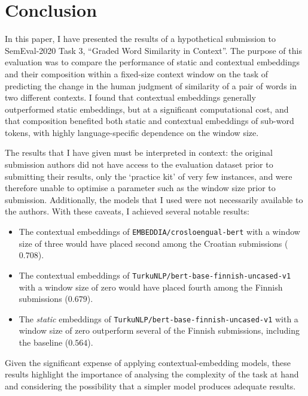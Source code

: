 \section{Conclusion}
\label{sec:conclusion}

In this paper, I have presented the results of a hypothetical submission to SemEval-2020
Task 3, ``Graded Word Similarity in Context''.
The purpose of this evaluation was to compare the performance of static and contextual
embeddings and their composition within a fixed-size context window on the task of
predicting the change in the human judgment of similarity of a pair of words in two
different contexts.
I found that contextual embeddings generally outperformed static embeddings, but at a
significant computational cost, and that composition benefited both static and
contextual embeddings of sub-word tokens, with highly language-specific dependence
on the window size.

The results that I have given must be interpreted in context: the original submission
authors did not have access to the evaluation dataset prior to submitting their results,
only the `practice kit' of very few instances, and were therefore unable to optimise a
parameter such as the window size prior to submission.
Additionally, the models that I used were not necessarily available to the authors.
With these caveats, I achieved several notable results:
\begin{itemize}
  \item The contextual embeddings of \texttt{EMBEDDIA/crosloengual-bert} with a window
        size of three would have placed second among the Croatian submissions
        ($0.708$).
  \item The contextual embeddings of \texttt{TurkuNLP/bert-base-finnish-uncased-v1} with
        a window size of zero would have placed fourth among the Finnish submissions
        ($0.679$).
  \item The \emph{static} embeddings of \texttt{TurkuNLP/bert-base-finnish-uncased-v1}
        with a window size of zero outperform several of the Finnish submissions,
        including the baseline ($0.564$).
\end{itemize}
Given the significant expense of applying contextual-embedding models, these results
highlight the importance of analysing the complexity of the task at hand and considering
the possibility that a simpler model produces adequate results.